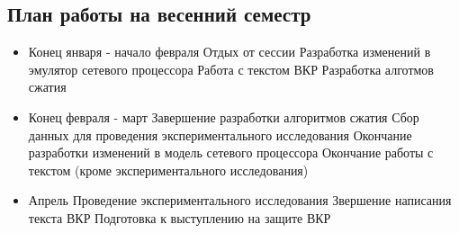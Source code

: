 \documentclass[a4peper, 12pt, titlepage, finall]{extreport}
\begin{document}
        \subsection{План работы на весенний семестр}
            \begin{itemize}
                \item Конец января - начало февраля
                    \subitem Отдых от сессии
                    \subitem Разработка изменений в эмулятор сетевого процессора
                    \subitem Работа с текстом ВКР
                    \subitem Разработка алготмов сжатия
                \item Конец февраля - март
                    \subitem Завершение разработки алгоритмов сжатия
                    \subitem Сбор данных для проведения экспериментального исследования
                    \subitem Окончание разработки изменений в модель сетевого процессора
                    \subitem Окончание работы с текстом (кроме экспериментального исследования)
                \item Апрель
                    \subitem Проведение экспериментального исследования
                    \subitem Звершение написания текста ВКР
                    \subitem Подготовка к выступлению на защите ВКР
            \end{itemize}
\end{document}
